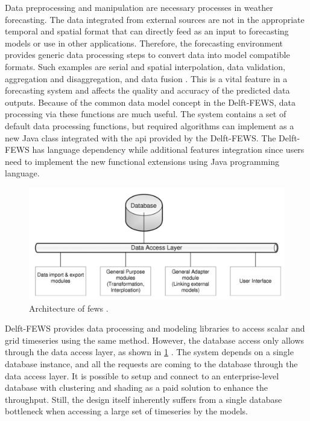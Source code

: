 Data preprocessing and manipulation are necessary processes in weather forecasting. The data integrated from external sources are not in the appropriate temporal and spatial format that can directly feed as an input to forecasting models or use in other applications. Therefore, the forecasting environment provides generic data processing steps to convert data into model compatible formats. Such examples are serial and spatial interpolation, data validation, aggregation and disaggregation, and data fusion \cite{Werner2013TheSystem}. This is a vital feature in a forecasting system and affects the quality and accuracy of the predicted data outputs. Because of the common data model concept in the Delft-FEWS, data processing via these functions are much useful. The system contains a set of default data processing functions, but required algorithms can implement as a new Java class integrated with the \acrfull{api} provided by the Delft-FEWS. The Delft-FEWS has language dependency while additional features integration since users need to implement the new functional extensions using Java programming language.

\begin{figure}[htp]
    \centering
    \includegraphics[width=1.0\textwidth]{lit/fews/Architecture-of-Delft-FEWS-showing-the-data-base-the-data-access-layers-and-examples-of_W640.png}
    \caption[Architecture of \acrshort{fews}]{Architecture of \acrshort{fews} \cite{Werner2013TheSystem}.}
    \label{fi:fews_data_layer}
\end{figure}

Delft-FEWS provides data processing and modeling libraries to access scalar and grid timeseries using the same method. However, the database access only allows through the data access layer, as shown in \cref{fi:fews_data_layer} \cite{Werner2013TheSystem}. The system depends on a single database instance, and all the requests are coming to the database through the data access layer. It is possible to setup and connect to an enterprise-level database with clustering and shading as a paid solution to enhance the throughput. Still, the design itself inherently suffers from a single database bottleneck when accessing a large set of timeseries by the models.

